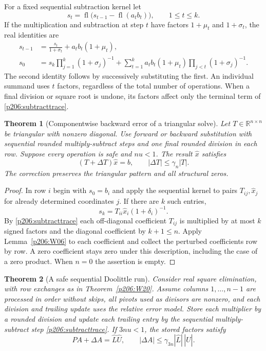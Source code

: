 \documentclass[11pt,oneside,openany]{book}
\theoremstyle{plain}
\newtheorem{theorem}{Theorem}[chapter]
\theoremstyle{definition}
\theoremstyle{remark}
\begin{document}
For a fixed sequential subtraction kernel let
\[
  s_t=\operatorname{fl}\bigl(s_{t-1}
                    -\operatorname{fl}(a_tb_t)\bigr),
  \qquad 1\le t\le k .
\]
If the multiplication and subtraction at step \(t\) have factors
\(1+\mu_t\) and \(1+\sigma_t\), the real identities are
\[
 \begin{aligned}
 s_{t-1}&=\frac{s_t}{1+\sigma_t}+a_tb_t(1+\mu_t),\\
 s_0&=s_k\prod_{j=1}^{k}(1+\sigma_j)^{-1}
      +\sum_{t=1}^k a_tb_t(1+\mu_t)
                      \prod_{j<t}(1+\sigma_j)^{-1}.
 \end{aligned}                                                   \tag{4.1}\label{p206:subtracttrace}
\]
The second identity follows by successively substituting the first.
An individual summand uses \(t\) factors, regardless of the total
number of operations. When a final division or square root is
undone, its factors affect only the terminal term of
\eqref{p206:subtracttrace}.

\begin{theorem}[Componentwise backward error of a triangular solve]
\label{p206:W21}
Let \(T\in\mathbb R^{n\times n}\) be triangular with nonzero diagonal.
Use forward or backward substitution with sequential rounded
multiply-subtract steps and one final rounded division in each row.
Suppose every operation is safe and \(nu<1\). The result
\(\hat x\) satisfies
\[
        (T+\Delta T)\hat x=b,\qquad
        |\Delta T|\le \gamma_n|T|.
\]
The correction preserves the triangular pattern and all structural
zeros.
\end{theorem}

\begin{proof}
In row \(i\) begin with \(s_0=b_i\) and apply the sequential
kernel to pairs \(T_{ij},\hat x_j\) for already determined
coordinates \(j\). If there are \(k\) such entries,
\[
 s_k=T_{ii}\hat x_i(1+\delta_i)^{-1}.
\]
By \eqref{p206:subtracttrace} each off-diagonal coefficient \(T_{ij}\) is multiplied
by at most \(k\) signed factors and the diagonal coefficient
by \(k+1\le n\). Apply Lemma~\ref{p206:W06} to each coefficient
and collect the perturbed coefficients row by row. A zero
coefficient stays zero under this description, including the
case of a zero product. When \(n=0\) the assertion is empty.
\end{proof}

\begin{theorem}[A safe sequential Doolittle run]\label{p206:W22}
Consider real square elimination, with row exchanges as in
Theorem~\ref{p206:W20}. Assume columns \(1,\ldots,n-1\) are
processed in order without skips, all pivots used as divisors
are nonzero, and each division and trailing update uses the
relative error model.
Store each multiplier by a rounded division and update each
trailing entry by the sequential multiply-subtract step
\eqref{p206:subtracttrace}.
If \(3nu<1\), the stored factors satisfy
\[
 PA+\Delta A=\hat L\hat U,\qquad
             |\Delta A|\le\gamma_{3n}|\hat L|\,|\hat U|.
\]
\end{theorem}
\end{document}
